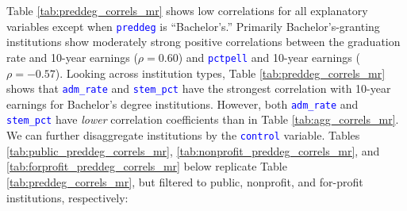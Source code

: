 \documentclass[12pt]{article}
\numberwithin{equation}{section}
\newcommand{\Varnm}[1]{\texttt{\textcolor{Blue}{#1}}}
\begin{document}
\begin{table}[ht!]
\caption{Correlations by primary degree granted (\Varnm{preddeg})}
\label{tab:preddeg_correls_mr}
\centering
{}
\end{table}

Table \ref{tab:preddeg_correls_mr} shows low correlations for all explanatory variables except when \Varnm{preddeg} is \enquote{Bachelor's.} Primarily Bachelor's-granting institutions show moderately strong positive correlations between the graduation rate and 10-year earnings ($\rho=0.60$)  and \Varnm{pctpell} and 10-year earnings ($\rho=-0.57$). Looking across institution types, Table \ref{tab:preddeg_correls_mr} shows that \Varnm{adm\_rate} and \Varnm{stem\_pct} have the strongest correlation with 10-year earnings for Bachelor's degree institutions. However, both \Varnm{adm\_rate} and \Varnm{stem\_pct} have \textit{lower} correlation coefficients than in Table \ref{tab:agg_correls_mr}. We can further disaggregate institutions by the \Varnm{control} variable. Tables \ref{tab:public_preddeg_correls_mr}, \ref{tab:nonprofit_preddeg_correls_mr}, and \ref{tab:forprofit_preddeg_correls_mr} below replicate Table \ref{tab:preddeg_correls_mr}, but filtered to public, nonprofit, and for-profit institutions, respectively:
\end{document}
